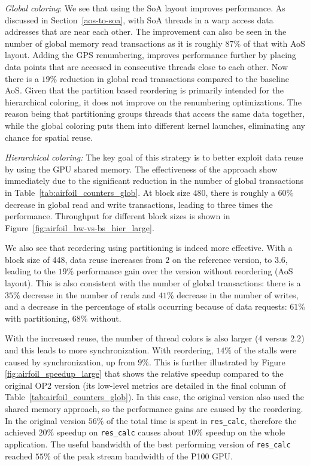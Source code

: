 \emph{Global coloring}: We see that using the SoA layout improves performance. 
As discussed in Section~\ref{aos-to-soa}, with SoA threads in a warp access data 
addresses that are near each other. The improvement can also be seen in 
the number of global memory read transactions as it is roughly $87\%$ of that 
with AoS layout. Adding the GPS renumbering, improves performance 
further by placing data points that are accessed in consecutive threads close 
to each other. Now there is a $19\%$ reduction in global read transactions 
compared to the baseline AoS. Given that the partition based reordering is 
primarily intended for the hierarchical coloring, it does not improve on the 
renumbering optimizations. The reason being that partitioning groups threads 
that access the same data together, while the global coloring puts them into 
different kernel launches, eliminating any chance for spatial reuse.

\emph{Hierarchical coloring:}  The key goal of this strategy is to better 
exploit data reuse by using the GPU shared memory. The effectiveness of the 
approach show immediately due to the significant reduction in the number of 
global transactions in Table~\ref{tab:airfoil_counters_glob}. At block size 
$480$, there is roughly a $60\%$ decrease in global read and write 
transactions, leading to three times the performance. Throughput for different 
block sizes is shown in Figure~\ref{fig:airfoil_bw-vs-bs_hier_large}.

We also see that reordering using partitioning is indeed more effective. With
a block size of 448, data reuse increases from $2$ on the reference version,
to $3.6$, leading to the $19\%$ performance gain over the version without
reordering (AoS layout). This is also consistent with the number of global
transactions: there is a $35\%$ decrease in the number of reads and $41\%$
decrease in the number of writes, and a decrease in the percentage of stalls
occurring because of data requests: $61\%$ with partitioning, $68\%$ without.

With the increased reuse, the number of thread colors is also larger ($4$
versus $2.2$) and this leads to more synchronization. With reordering, $14\%$
of the stalls were caused by synchronization, up from $9\%$. This is further 
illustrated by Figure \ref{fig:airfoil_speedup_large} that shows the relative 
speedup compared to the original OP2 version (its low-level metrics are detailed 
in the final column of Table~\ref{tab:airfoil_counters_glob}). In this case, the 
original version also used the shared memory approach, so the performance gains 
are caused by the reordering. In the original version $56\%$ of the total time 
is spent in \texttt{res\_calc}, therefore the achieved $20\%$ speedup on 
\texttt{res\_calc} causes about $10\%$ speedup on the whole application. 
The useful bandwidth of the best performing version of \texttt{res\_calc} 
 reached $55\%$ of the peak stream bandwidth of the P100 GPU. %


